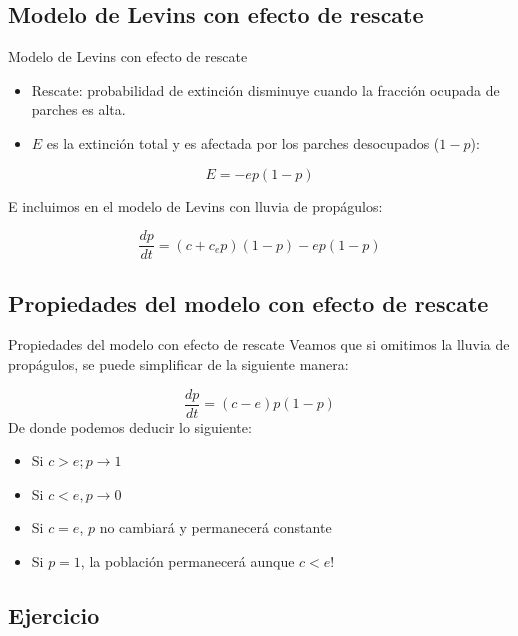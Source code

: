 \documentclass[
  11pt,
  ignorenonframetext,
]{beamer}
\begin{document}
\hypertarget{modelo-de-levins-con-efecto-de-rescate}{%
\subsection{Modelo de Levins con efecto de
rescate}\label{modelo-de-levins-con-efecto-de-rescate}}

\begin{frame}{Modelo de Levins con efecto de rescate}
\begin{itemize}
\item
  Rescate: probabilidad de extinción disminuye cuando la fracción
  ocupada de parches es alta.
\item
  \(E\) es la extinción total y es afectada por los parches desocupados
  (\(1-p\)):
\end{itemize}

\[E = -ep(1-p)\]

E incluimos en el modelo de Levins con lluvia de propágulos:

\[\frac{dp}{dt} = (c + c_e p)(1-p) - ep(1-p)\]
\end{frame}

\hypertarget{propiedades-del-modelo-con-efecto-de-rescate}{%
\subsection{Propiedades del modelo con efecto de
rescate}\label{propiedades-del-modelo-con-efecto-de-rescate}}

\begin{frame}{Propiedades del modelo con efecto de rescate}
Veamos que si omitimos la lluvia de propágulos, se puede simplificar de
la siguiente manera:

\[\frac{dp}{dt} = (c - e)p(1-p)\] De donde podemos deducir lo siguiente:

\begin{itemize}
\item
  Si \(c > e; p \rightarrow 1\)
\item
  Si \(c < e, p \rightarrow 0\)
\item
  Si \(c = e\), \(p\) no cambiará y permanecerá constante
\item
  Si \(p = 1\), la población permanecerá aunque \(c < e\)!
\end{itemize}
\end{frame}

\hypertarget{ejercicio}{%
\subsection{Ejercicio}\label{ejercicio}}
\end{document}

